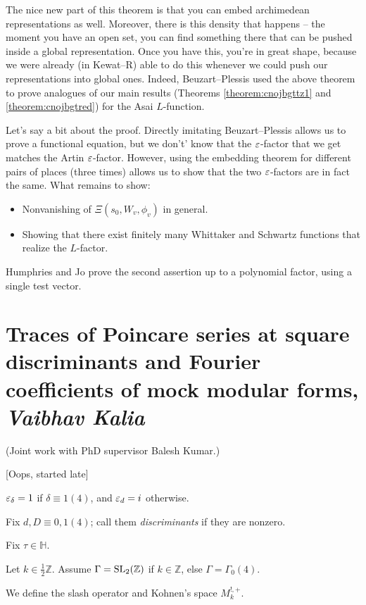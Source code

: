 \documentclass[reqno]{amsart} 
\begin{document}
The nice new part of this theorem is that you can embed archimedean representations as well.  Moreover, there is this density that happens -- the moment you have an open set, you can find something there that can be pushed inside a global representation.  Once you have this, you're in great shape, because we were already (in Kewat--R) able to do this whenever we could push our representations into global ones.  Indeed, Beuzart--Plessis used the above theorem to prove analogues of our main results (Theorems \ref{theorem:cnojbgttz1} and \ref{theorem:cnojbgtred}) for the Asai $L$-function.

Let's say a bit about the proof.  Directly imitating Beuzart--Plessis allows us to prove a functional equation, but we don't' know that the $\varepsilon$-factor that we get matches the Artin $\varepsilon$-factor.  However, using the embedding theorem for different pairs of places (three times) allows us to show that the two $\varepsilon$-factors are in fact the same.  What remains to show:
\begin{itemize}
\item Nonvanishing of $\Xi(s_0, W_v, \phi_v)$ in general.
\item Showing that there exist finitely many Whittaker and Schwartz functions that realize the $L$-factor.
\end{itemize}
Humphries and Jo \cite{2021arXiv2112.06860} prove the second assertion up to a polynomial factor, using a single test vector.

\section{Traces of Poincare series at square discriminants and Fourier coefficients of mock modular forms, \textnormal{\emph{Vaibhav Kalia}}}
(Joint work with PhD supervisor Balesh Kumar.)

[Oops, started late]

$\varepsilon_\delta = 1$ if $\delta \equiv 1(4)$, and $\varepsilon_d = i$ otherwise.

Fix $d, D \equiv 0, 1 (4)$; call them \emph{discriminants} if they are nonzero.

Fix $\tau \in \mathbb{H}$.

Let $k \in \tfrac{1}{2} \mathbb{Z}$. Assume $\Gamma = \operatorname{SL}_2(\mathbb{Z})$ if $k \in \mathbb{Z}$, else $\Gamma = \Gamma_0(4)$.

We define the slash operator and Kohnen's space $M_k^{!, +}$.
\end{document}
